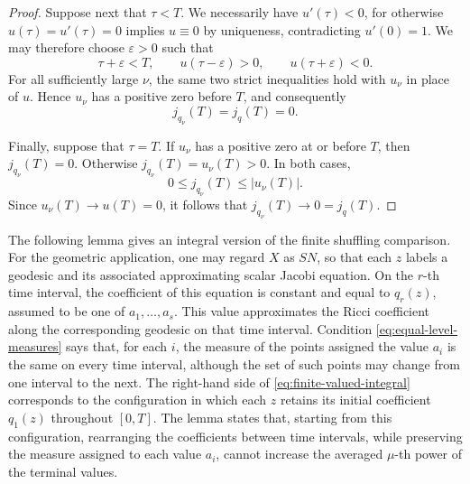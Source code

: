 \documentclass[11pt, reqno]{amsart}
\begin{document}
\begin{proof}
Suppose next that $\tau<T$. We necessarily have $u'(\tau)<0$, for otherwise $u(\tau)=u'(\tau)=0$ implies $u\equiv0$ by uniqueness, contradicting $u'(0)=1$. We may therefore choose $\varepsilon>0$ such that
$$
\tau+\varepsilon<T, \qquad u(\tau-\varepsilon)>0, \qquad u(\tau+\varepsilon)<0.
$$
For all sufficiently large $\nu$, the same two strict inequalities hold with $u_\nu$ in place of $u$. Hence $u_\nu$ has a positive zero before $T$, and consequently
$$j_{q_\nu}(T)=j_q(T)=0. $$

Finally, suppose that $\tau=T$. If $u_\nu$ has a positive zero at or before $T$, then $j_{q_\nu}(T)=0$. Otherwise $j_{q_\nu}(T)=u_\nu(T)>0$. In both cases,
$$0\le j_{q_\nu}(T)\le |u_\nu(T)|. $$
Since $u_\nu(T)\to u(T)=0$, it follows that $j_{q_\nu}(T)\to0=j_q(T)$.
\end{proof}

The following lemma gives an integral version of the finite shuffling comparison. For the geometric application, one may regard $X$ as $SN$, so that each $z$ labels a geodesic and its associated approximating scalar Jacobi equation. On the $r$-th time interval, the coefficient of this equation is constant and equal to $q_r(z)$, assumed to be one of $a_1, \ldots, a_s$. This value approximates the Ricci coefficient along the corresponding geodesic on that time interval. Condition \eqref{eq:equal-level-measures} says that, for each $i$, the measure of the points assigned the value $a_i$ is the same on every time interval, although the set of such points may change from one interval to the next. The right-hand side of \eqref{eq:finite-valued-integral} corresponds to the configuration in which each $z$ retains its initial coefficient $q_1(z)$ throughout $[0, T]$. The lemma states that, starting from this configuration, rearranging the coefficients between time intervals, while preserving the measure assigned to each value $a_i$, cannot increase the averaged $\mu$-th power of the terminal values.
\end{document}
